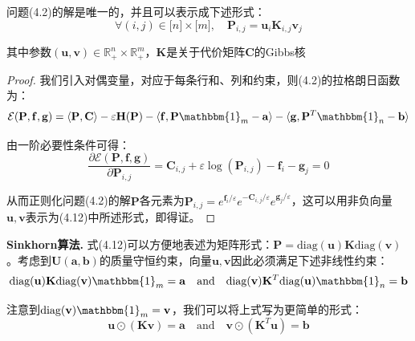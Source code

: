 \documentclass[cn,10pt,math=newtx,citestyle=gb7714-2015,bibstyle=gb7714-2015]{elegantbook}
\begin{document}
\begin{proposition}
问题(4.2)的解是唯一的，并且可以表示成下述形式：
\begin{equation}
    \label{4.12}
    \forall (i,j)\in \mathbb{[}n\mathbb{]}\times \mathbb{[}m\mathbb{]}, \quad \mathbf{P}_{i,j}=\mathbf{u}_i\mathbf{K}_{i,j}\mathbf{v}_j
\end{equation}

其中参数$(\mathbf{u,v})\in \mathbb{R}_+^n \times \mathbb{R}_+^m$，$\mathbf{K}$是关于代价矩阵$\mathbf{C}$的Gibbs核
\end{proposition}

\begin{proof}
我们引入对偶变量，对应于每条行和、列和约束，则(4.2)的拉格朗日函数为：
\begin{equation*}
    \mathcal{E}(\mathbf{P,f,g}) = \langle \mathbf{P,C} \rangle - \varepsilon \mathbf{H(P)} - \langle \mathbf{f}, \mathbf{P}\mathbbm{1}_m-\mathbf{a} \rangle - \langle \mathbf{g}, \mathbf{P}^T \mathbbm{1}_n - \mathbf{b} \rangle
\end{equation*}

由一阶必要性条件可得：
\begin{equation*}
    \frac{\partial \mathcal{E}(\mathbf{P,f,g})}{\partial \mathbf{P}_{i,j}} = \mathbf{C}_{i,j} + \varepsilon \log(\mathbf{P}_{i,j}) - \mathbf{f}_i - \mathbf{g}_j = 0
\end{equation*}

从而正则化问题(4.2)的解$\mathbf{P}$各元素为$\mathbf{P}_{i,j}=e^{\mathbf{f}_i/\varepsilon}e^{-\mathbf{C}_{i,j}/\varepsilon}e^{\mathbf{g}_j/\varepsilon}$，这可以用非负向量$\mathbf{u,v}$表示为(4.12)中所述形式，即得证。
\end{proof}

\vspace{1.5em}

\textbf{Sinkhorn算法.} 式(4.12)可以方便地表述为矩阵形式：$\mathbf{P}=\text{diag}(\mathbf{u})\mathbf{K}\text{diag}(\mathbf{v})$。考虑到$\mathbf{U(a,b)}$的质量守恒约束，向量$\mathbf{u,v}$因此必须满足下述非线性约束：
\begin{equation}
    \label{4.13}
    \text{diag}(\mathbf{u})\mathbf{K}\text{diag}(\mathbf{v})\mathbbm{1}_m=\mathbf{a} \quad \text{and} \quad \text{diag}(\mathbf{v})\mathbf{K}^T\text{diag}(\mathbf{u})\mathbbm{1}_n=\mathbf{b}
\end{equation}

注意到$\text{diag}(\mathbf{v})\mathbbm{1}_m=\mathbf{v}$，我们可以将上式写为更简单的形式：
\begin{equation}
    \label{4.14}
    \mathbf{u}\odot (\mathbf{Kv}) = \mathbf{a} \quad \text{and} \quad \mathbf{v}\odot (\mathbf{K}^T\mathbf{u}) = \mathbf{b}
\end{equation}
\end{document}
